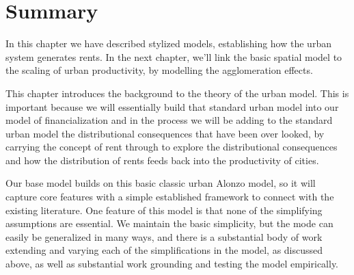 \section{Summary}
In this chapter we have described %
stylized models, establishing how the urban system generates rents. %
In the next chapter, we'll link the basic spatial model to the scaling of urban productivity, by modelling the agglomeration effects.

This chapter introduces the background to the theory of the urban model. This is important because we will essentially build that standard urban model into our model of financialization and in the process we will be adding to the standard urban model the distributional consequences that have been over looked, by carrying the concept of rent through to explore the distributional consequences and how the distribution of rents feeds back into the productivity of cities. 

Our base model builds on this basic classic urban Alonzo model, so it will capture core features with a simple established framework to connect with the existing literature.  
One feature of this model is that none of the simplifying assumptions are essential. We maintain the basic simplicity, but the mode can easily be generalized in many ways, and there is a substantial body of work extending and varying each of the simplifications in the model, as discussed above, as well as substantial work grounding and testing the model empirically.